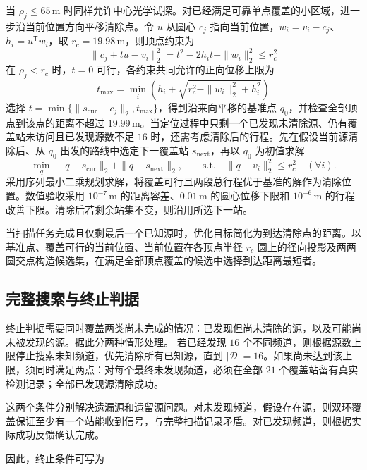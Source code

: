 \documentclass[withoutpreface,bwprint]{cumcmthesis} %
\begin{document}
当 $\rho_j\leq65\,\mathrm m$ 时同样允许中心光学试探。对已经满足可靠单点覆盖的小区域，进一步沿当前位置方向平移清除点。令 $u$ 从圆心 $c_j$ 指向当前位置，$w_i=v_i-c_j$、$h_i=u^{\mathsf T}w_i$，取 $r_c=19.98\,\mathrm m$，则顶点约束为
\begin{equation}
 \|c_j+tu-v_i\|_2^2=t^2-2h_it+\|w_i\|_2^2\leq r_c^2
\end{equation}
在 $\rho_j<r_c$ 时，$t=0$ 可行，各约束共同允许的正向位移上限为
\begin{equation}
 t_{\max}=\min_i\left(h_i+\sqrt{r_c^2-\|w_i\|_2^2+h_i^2}\right)
 \label{eq:b26-clear-shift}
\end{equation}
选择 $t=\min\{\|s_{\mathrm{cur}}-c_j\|_2,t_{\max}\}$，得到沿来向平移的基准点 $q_0$，并检查全部顶点到该点的距离不超过 $19.99\,\mathrm m$。当定位过程中只剩一个已发现未清除源、仍有覆盖站未访问且已发现源数不足 $16$ 时，还需考虑清除后的行程。先在假设当前源清除后、从 $q_0$ 出发的路线中选定下一覆盖站 $s_{\mathrm{next}}$，再以 $q_0$ 为初值求解
\begin{equation}
 \min_q\ \|q-s_{\mathrm{cur}}\|_2+\|q-s_{\mathrm{next}}\|_2,
 \qquad\text{s.t.}\quad
 \|q-v_i\|_2^2\leq r_c^2\quad(\forall i).
 \label{eq:b26-q4-next-clear}
\end{equation}
采用序列最小二乘规划求解，将覆盖可行且两段总行程优于基准的解作为清除位置。数值验收采用 $10^{-7}\,\mathrm m$ 的距离容差、$0.01\,\mathrm m$ 的圆心位移下限和 $10^{-6}\,\mathrm m$ 的行程改善下限。清除后若剩余站集不变，则沿用所选下一站。

当扫描任务完成且仅剩最后一个已知源时，优化目标简化为到达清除点的距离。以基准点、覆盖可行的当前位置、当前位置在各顶点半径 $r_c$ 圆上的径向投影及两两圆交点构造候选集，在满足全部顶点覆盖的候选中选择到达距离最短者。

\subsection{完整搜索与终止判据}
终止判据需要同时覆盖两类尚未完成的情况：已发现但尚未清除的源，以及可能尚未被发现的源。据此分两种情形处理。
若已经发现 $16$ 个不同频道，则根据源数上限停止搜索未知频道，优先清除所有已知源，直到 $|\mathcal D|=16$。如果尚未达到该上限，须同时满足两点：对每个最终未发现频道，必须在全部 $21$ 个覆盖站留有真实检测记录；全部已发现源清除成功。

这两个条件分别解决遗漏源和遗留源问题。对未发现频道，假设存在源，则双环覆盖保证至少有一个站能收到信号，与完整扫描记录矛盾。对已发现频道，则根据实际成功反馈确认完成。

因此，终止条件可写为
\end{document}
